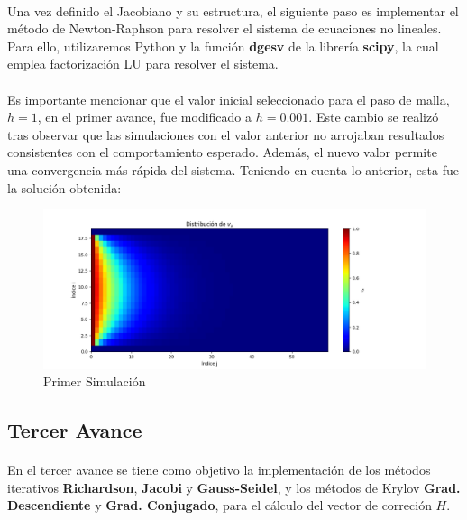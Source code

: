 \documentclass{article}
\begin{document}
  \paragraph{}
  Una vez definido el Jacobiano y su estructura, el siguiente paso es implementar el método de Newton-Raphson para resolver el sistema de ecuaciones no lineales. Para ello, utilizaremos Python y la función \textbf{dgesv} de la librería \textbf{scipy}, la cual emplea factorización LU para resolver el sistema.

  \paragraph{}
  Es importante mencionar que el valor inicial seleccionado para el paso de malla, $h=1$, en el primer avance, fue modificado a $h=0.001$. Este cambio se realizó tras observar que las simulaciones con el valor anterior no arrojaban resultados consistentes con el comportamiento esperado. Además, el nuevo valor permite una convergencia más rápida del sistema. Teniendo en cuenta lo anterior, esta fue la solución obtenida:

  \begin{figure}[H]
    \centering
    \includegraphics[width=1.2\textwidth]{GaussJordanSol.png}
    \caption{Primer Simulación}
  \end{figure}

  \subsection*{Tercer Avance}
  \paragraph{}
  En el tercer avance se tiene como objetivo la implementación de los métodos iterativos \textbf{Richardson}, \textbf{Jacobi} y \textbf{Gauss-Seidel}, y los métodos de Krylov \textbf{Grad. Descendiente} y \textbf{Grad. Conjugado}, para el cálculo del vector de correción $H$.
\end{document}
